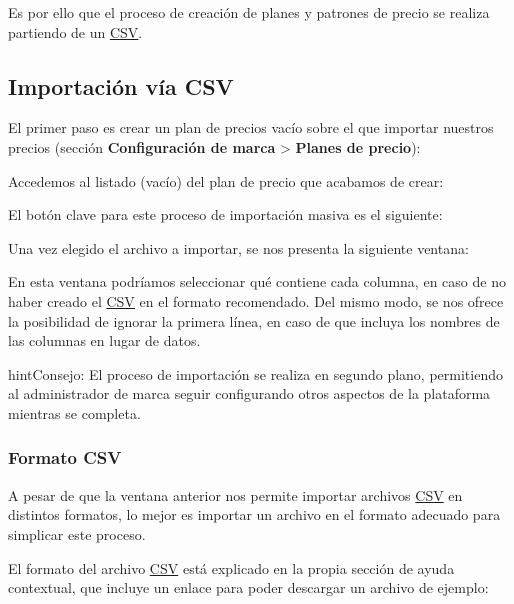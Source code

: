 \documentclass[letterpaper,10pt,spanish]{sphinxmanual}
\begin{document}
Es por ello que el proceso de creación de planes y patrones de precio se realiza partiendo de un \href{https://es.wikipedia.org/wiki/CSV}{CSV}.


\subsection{Importación vía CSV}
\label{billing_and_invoices/pricing_plans:importing-a-csv-file}
El primer paso es crear un plan de precios vacío sobre el que importar nuestros precios (sección \textbf{Configuración de marca} \textgreater{} \textbf{Planes de precio}):

\noindent{}

Accedemos al listado (vacío) del plan de precio que acabamos de crear:

\noindent{}

El botón clave para este proceso de importación masiva es el siguiente:

\noindent{}

Una vez elegido el archivo a importar, se nos presenta la siguiente ventana:

\noindent{}

En esta ventana podríamos seleccionar qué contiene cada columna, en caso de no haber creado el \href{https://es.wikipedia.org/wiki/CSV}{CSV} en el formato recomendado. Del mismo modo, se nos ofrece la posibilidad de ignorar la primera línea, en caso de que incluya los nombres de las columnas en lugar de datos.

\begin{notice}{hint}{Consejo:}
El proceso de importación se realiza en segundo plano, permitiendo al administrador de marca seguir configurando otros aspectos de la plataforma mientras se completa.
\end{notice}


\subsubsection{Formato CSV}
\label{billing_and_invoices/pricing_plans:csv-format}
A pesar de que la ventana anterior nos permite importar archivos \href{https://es.wikipedia.org/wiki/CSV}{CSV} en distintos formatos, lo mejor es importar un archivo en el formato adecuado para simplicar este proceso.

El formato del archivo \href{https://es.wikipedia.org/wiki/CSV}{CSV} está explicado en la propia sección de ayuda contextual, que incluye un enlace para poder descargar un archivo de ejemplo:
\end{document}
